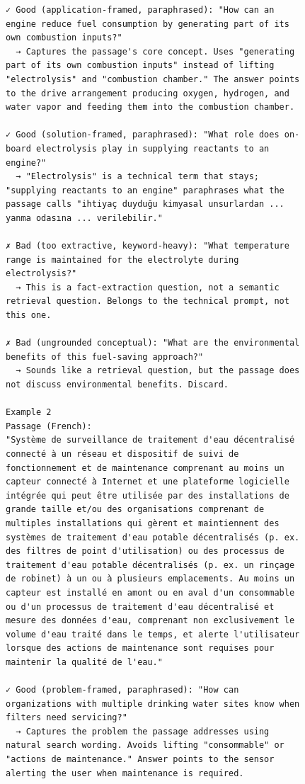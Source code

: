 \begin{figure}[h!]
\begin{minipage}{0.95\textwidth}
\begin{Verbatim}[breaklines=true, breakanywhere=true]
✓ Good (application-framed, paraphrased): "How can an engine reduce fuel consumption by generating part of its own combustion inputs?"
  → Captures the passage's core concept. Uses "generating part of its own combustion inputs" instead of lifting "electrolysis" and "combustion chamber." The answer points to the drive arrangement producing oxygen, hydrogen, and water vapor and feeding them into the combustion chamber.

✓ Good (solution-framed, paraphrased): "What role does on-board electrolysis play in supplying reactants to an engine?"
  → "Electrolysis" is a technical term that stays; "supplying reactants to an engine" paraphrases what the passage calls "ihtiyaç duyduğu kimyasal unsurlardan ... yanma odasına ... verilebilir."

✗ Bad (too extractive, keyword-heavy): "What temperature range is maintained for the electrolyte during electrolysis?"
  → This is a fact-extraction question, not a semantic retrieval question. Belongs to the technical prompt, not this one.

✗ Bad (ungrounded conceptual): "What are the environmental benefits of this fuel-saving approach?"
  → Sounds like a retrieval question, but the passage does not discuss environmental benefits. Discard.

Example 2
Passage (French):
"Système de surveillance de traitement d'eau décentralisé connecté à un réseau et dispositif de suivi de fonctionnement et de maintenance comprenant au moins un capteur connecté à Internet et une plateforme logicielle intégrée qui peut être utilisée par des installations de grande taille et/ou des organisations comprenant de multiples installations qui gèrent et maintiennent des systèmes de traitement d'eau potable décentralisés (p. ex. des filtres de point d'utilisation) ou des processus de traitement d'eau potable décentralisés (p. ex. un rinçage de robinet) à un ou à plusieurs emplacements. Au moins un capteur est installé en amont ou en aval d'un consommable ou d'un processus de traitement d'eau décentralisé et mesure des données d'eau, comprenant non exclusivement le volume d'eau traité dans le temps, et alerte l'utilisateur lorsque des actions de maintenance sont requises pour maintenir la qualité de l'eau."

✓ Good (problem-framed, paraphrased): "How can organizations with multiple drinking water sites know when filters need servicing?"
  → Captures the problem the passage addresses using natural search wording. Avoids lifting "consommable" or "actions de maintenance." Answer points to the sensor alerting the user when maintenance is required.


\end{Verbatim}
\end{minipage}
\end{figure}
